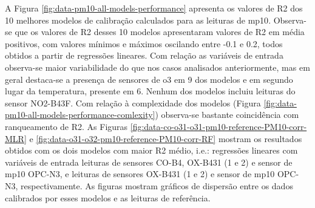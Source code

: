 A Figura \ref{fig:data-pm10-all-models-performance} apresenta os valores de R2 dos 10 melhores modelos de calibração calculados para as leituras de \acrshort{mp10}. Observa-se que os valores de R2 desses 10 modelos apresentaram valores de R2 em média positivos, com valores mínimos e máximos oscilando entre -0.1 e 0.2, todos obtidos a partir de regressões lineares. Com relação as variáveis de entrada observa-se maior variabilidade do que nos casos analisados anteriormente, mas em geral destaca-se a presença de sensores de \acrshort{o3} em 9 dos modelos e em segundo lugar da temperatura, presente em 6. Nenhum dos modelos incluiu leituras do sensor NO2-B43F. Com relação à complexidade dos modelos (Figura \ref{fig:data-pm10-all-models-performance-comlexity}) observa-se bastante coincidência com ranqueamento de R2. As Figuras \ref{fig:data-co-o31-o31-pm10-reference-PM10-corr-MLR} e \ref{fig:data-o31-o32-pm10-reference-PM10-corr-RF} mostram os resultados obtidos com os dois modelos com maior R2 médio, i.e.: regressões lineares com variáveis de entrada leituras de sensores CO-B4, OX-B431 (1 e 2) e sensor de \acrshort{mp10} OPC-N3, e leituras de sensores OX-B431 (1 e 2) e sensor de \acrshort{mp10} OPC-N3, respectivamente. As figuras mostram gráficos de dispersão entre os dados calibrados por esses modelos e as leituras de referência.


